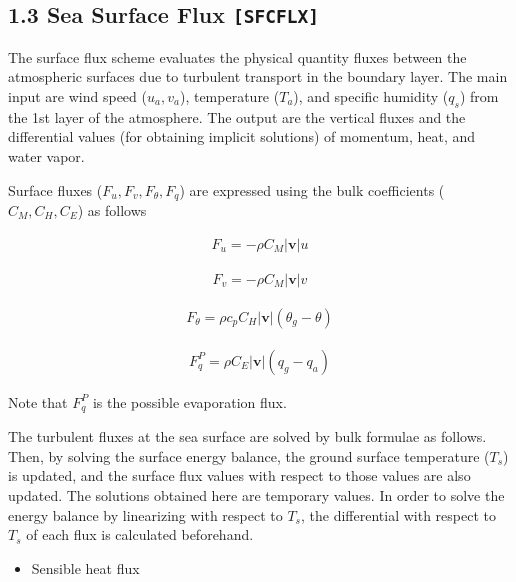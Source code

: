\begin{itemize}
\hypertarget{sea-surface-flux-sfcflx}{%
\subsection{\texorpdfstring{1.3 Sea Surface Flux
\texttt{{[}SFCFLX{]}}}{1.3 Sea Surface Flux {[}SFCFLX{]}}}\label{sea-surface-flux-sfcflx}}

The surface flux scheme evaluates the physical quantity fluxes between
the atmospheric surfaces due to turbulent transport in the boundary
layer. The main input are wind speed (\(u_a, v_a\)), temperature
(\(T_a\)), and specific humidity (\(q_s\)) from the 1st layer of the
atmosphere. The output are the vertical fluxes and the differential
values (for obtaining implicit solutions) of momentum, heat, and water
vapor.

Surface fluxes (\(F_u, F_v, F_\theta, F_q\)) are expressed using the
bulk coefficients (\(C_M, C_H, C_E\)) as follows

\begin{eqnarray}
    F_u  =  - \rho C_M |{\mathbf{v}}| u
\end{eqnarray}

\begin{eqnarray}
    F_v  =  - \rho C_M |{\mathbf{v}}| v
\end{eqnarray}

\begin{eqnarray}
    F_\theta  = \rho c_p C_H |{\mathbf{v}}| ( \theta_g - \theta )
\end{eqnarray}

\begin{eqnarray}
    F_q^P =  \rho C_E |{\mathbf{v}}| ( q_g - q_a )
\end{eqnarray}

Note that \(F_q^P\) is the possible evaporation flux.

The turbulent fluxes at the sea surface are solved by bulk formulae as
follows. Then, by solving the surface energy balance, the ground surface
temperature (\(T_s\)) is updated, and the surface flux values with
respect to those values are also updated. The solutions obtained here
are temporary values. In order to solve the energy balance by
linearizing with respect to \(T_s\), the differential with respect to
\(T_s\) of each flux is calculated beforehand.

\begin{itemize}
\tightlist
\item
  Sensible heat flux
\end{itemize}


\end{itemize}

